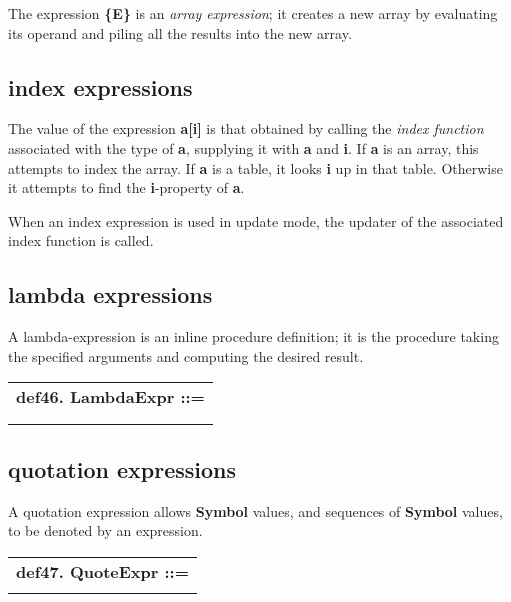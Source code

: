 \documentclass{report}
\begin{document}
The expression {\bf \{E\}} is an {\em array expression}; it creates a new array
by evaluating its operand and piling all the results into the new
array.

\subsection{index expressions}


The value of the expression {\bf a{[}i{]}} is that obtained by calling the
{\em index function} associated with the type of {\bf a}, supplying it with
{\bf a} and {\bf i}. If {\bf a} is an array, this attempts to index the array. If
{\bf a} is a table, it looks {\bf i} up in that table. Otherwise it attempts
to find the {\bf i}-property of {\bf a}.

When an index expression is used in update mode, the updater of the
associated index function is called.

\subsection{lambda expressions}


A lambda-expression is an inline procedure definition; it is the
procedure taking the specified arguments and computing the desired
result.

\begin{tabular}{l}
{\bf def46. LambdaExpr ::= }\\ 
\hspace*{3mm}{\tt "(" Args "=$>$" StatementSeq ")"} \\ 
\hspace*{3mm}{\tt  $\mid$ "fun" Args "=$>$" StatementSeq "endfun"} \\ 
\end{tabular}



\subsection{quotation expressions}


A quotation expression allows {\bf Symbol} values, and sequences of {\bf Symbol}
values, to be denoted by an expression.

\begin{tabular}{l}
{\bf def47. QuoteExpr ::= }\\ 
\hspace*{3mm}{\tt "`" QuotedItems "`"} \\ 
\end{tabular}
\end{document}
